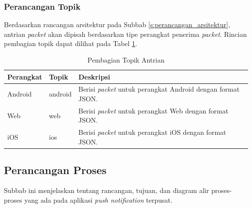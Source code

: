 \subsubsection{Perancangan Topik}
\par Berdasarkan rancangan arsitektur pada Subbab \ref{s:perancangan_arsitektur}, antrian \textit{packet} akan dipisah berdasarkan tipe perangkat penerima \textit{packet}. Rincian pembagian topik dapat dilihat pada Tabel \ref{t:pembagian_topik_antrian}.
\begin{longtable}{|p{2cm}|p{2cm}|p{5cm}|}
	\caption{Pembagian Topik Antrian} \label{t:pembagian_topik_antrian} \\ \hline
	\textbf{Perangkat} & \textbf{Topik} & \textbf{Deskripsi} \\ \hline
	Android & android & Berisi \textit{packet} untuk perangkat Android dengan format JSON. \\ \hline
	Web & web & Berisi \textit{packet} untuk perangkat Web dengan format JSON. \\ \hline
	iOS & ios & Berisi \textit{packet} untuk perangkat iOS dengan format JSON. \\ \hline
\end{longtable}

\subsection{Perancangan Proses}
\par Subbab ini menjelaskan tentang rancangan, tujuan, dan diagram alir proses-proses yang ada pada aplikasi \textit{push notification} terpusat.


